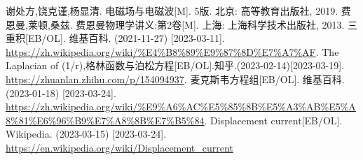 \begin{thebibliography}{99}%
     谢处方,饶克谨,杨显清. 电磁场与电磁波[M]. 5版. 北京: 高等教育出版社, 2019.
     费恩曼,莱顿,桑兹. 费恩曼物理学讲义:第2卷[M]. 上海: 上海科学技术出版社, 2013.
     三重积[EB/OL]. 维基百科. (2021-11-27) [2023-03-11]. \\\url{https://zh.wikipedia.org/wiki/%E4%B8%89%E9%87%8D%E7%A7%AF}.
     The Laplacian of (1/r),格林函数与泊松方程[EB/OL].知乎.(2023-02-14)[2023-03-19].\\\url{https://zhuanlan.zhihu.com/p/154094937}.
     麦克斯韦方程组[EB/OL]. 维基百科. (2023-01-18) [2023-03-24]. \\\url{https://zh.wikipedia.org/wiki/%E9%A6%AC%E5%85%8B%E5%A3%AB%E5%A8%81%E6%96%B9%E7%A8%8B%E7%B5%84}.
     Displacement current[EB/OL]. Wikipedia. (2023-03-15) [2023-03-24]. \\\url{https://en.wikipedia.org/wiki/Displacement_current}
\end{thebibliography}
